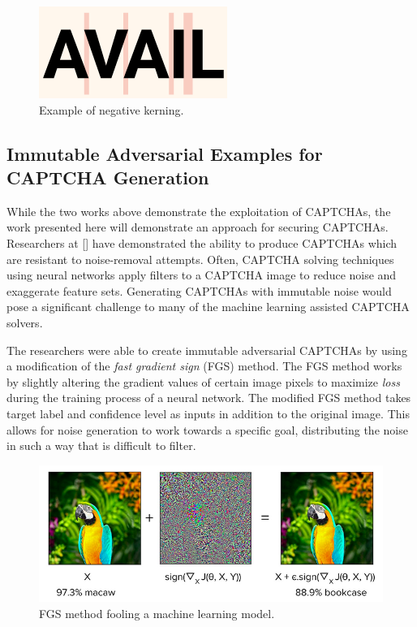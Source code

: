 \documentclass[11pt,conference]{IEEEtran}
\begin{document}
\begin{figure}[htbp]
    \centerline{\includegraphics[scale=0.5]{images/negative-kerning.png}}
    \caption{Example of negative kerning.}
    \label{figure}
\end{figure}

\subsection{Immutable Adversarial Examples for CAPTCHA Generation}
While the two works above demonstrate the exploitation of CAPTCHAs, the work
presented here will demonstrate an approach for securing CAPTCHAs. Researchers
at [] have demonstrated the ability to produce CAPTCHAs which are resistant to
noise-removal attempts. Often, CAPTCHA solving techniques using neural networks
apply filters to a CAPTCHA image to reduce noise and exaggerate feature
sets. Generating CAPTCHAs with immutable noise would pose a significant
challenge to many of the machine learning assisted CAPTCHA solvers.

The researchers were able to create immutable adversarial CAPTCHAs by using a
modification of the \emph{fast gradient sign} (FGS) method. The FGS method
works by slightly altering the gradient values of certain image pixels to
maximize \emph{loss} during the training process of a neural network. The
modified FGS method takes target label and confidence level as inputs in
addition to the original image. This allows for noise generation to work
towards a specific goal, distributing the noise in such a way that is
difficult to filter.

\begin{figure}[htbp]
    \centerline{\includegraphics[scale=0.35]{images/fgsm_technique.png}}
    \caption{FGS method fooling a machine learning model.}
    \label{figure}
\end{figure}
\end{document}
